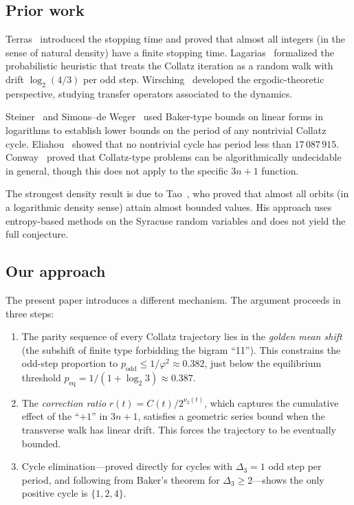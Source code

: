 \documentclass[manuscript]{aomart}
\theoremstyle{plain}
\theoremstyle{definition}
\theoremstyle{remark}
\numberwithin{equation}{section}
\begin{document}
\subsection{Prior work}

Terras~\cite{Terras1976} introduced the stopping time and proved that
almost all integers (in the sense of natural density) have a finite
stopping time.  Lagarias~\cite{Lagarias1985} formalized the
probabilistic heuristic that treats the Collatz iteration as a random
walk with drift $\log_2(4/3)$ per odd step.  Wirsching~\cite{Wirsching1998}
developed the ergodic-theoretic perspective, studying transfer
operators associated to the dynamics.

Steiner~\cite{Steiner1977} and Simons--de Weger~\cite{SimonsDeWeger2005}
used Baker-type bounds on linear forms in logarithms to establish
lower bounds on the period of any nontrivial Collatz cycle.
Eliahou~\cite{Eliahou1993} showed that no nontrivial cycle has period
less than $17\,087\,915$.  Conway~\cite{Conway1972} proved that
Collatz-type problems can be algorithmically undecidable in general,
though this does not apply to the specific $3n+1$ function.

The strongest density result is due to Tao~\cite{Tao2022}, who proved
that almost all orbits (in a logarithmic density sense) attain almost
bounded values.  His approach uses entropy-based methods on the
Syracuse random variables and does not yield the full conjecture.

\subsection{Our approach}

The present paper introduces a different mechanism.  The argument
proceeds in three steps:
\begin{enumerate}
  \item The parity sequence of every Collatz trajectory lies in the
    \emph{golden mean shift} (the subshift of finite type forbidding
    the bigram ``11'').  This constrains the odd-step proportion to
    $p_{\mathrm{odd}} \le 1/\varphi^2 \approx 0.382$, just below the
    equilibrium threshold $p_{\mathrm{eq}} = 1/(1 + \log_2 3)
    \approx 0.387$.
  \item The \emph{correction ratio} $r(t) = C(t)/2^{\nu_2(t)}$,
    which captures the cumulative effect of the ``$+1$'' in $3n+1$,
    satisfies a geometric series bound when the transverse walk has
    linear drift.  This forces the trajectory to be eventually
    bounded.
  \item Cycle elimination---proved directly for cycles with $\Delta_3 = 1$
    odd step per period, and following from Baker's theorem for
    $\Delta_3 \ge 2$---shows the only positive cycle is
    $\{1, 2, 4\}$.
\end{enumerate}
\end{document}
